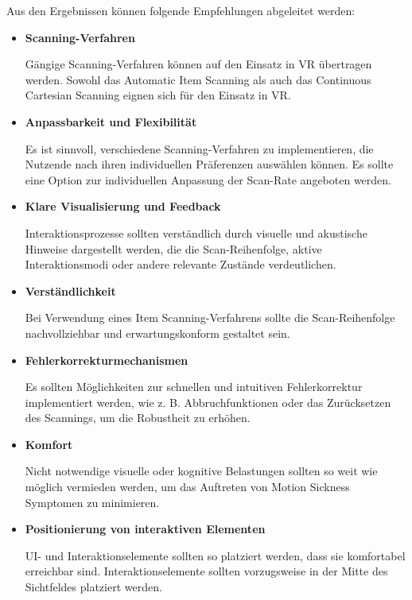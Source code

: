 Aus den Ergebnissen können folgende Empfehlungen abgeleitet werden:

\begin{itemize}
    \item \textbf{Scanning-Verfahren}
    
    Gängige Scanning-Verfahren können auf den Einsatz in VR übertragen werden. Sowohl das Automatic Item Scanning als auch das Continuous Cartesian Scanning eignen sich für den Einsatz in VR. 
    \item \textbf{Anpassbarkeit und Flexibilität}
    
    Es ist sinnvoll, verschiedene Scanning-Verfahren zu implementieren, die Nutzende nach ihren individuellen Präferenzen auswählen können. Es sollte eine Option zur individuellen Anpassung der Scan-Rate angeboten werden.  
    \item \textbf{Klare Visualisierung und Feedback}
    
    Interaktionsprozesse sollten verständlich durch visuelle und akustische Hinweise dargestellt werden, die die Scan-Reihenfolge, aktive Interaktionsmodi oder andere relevante Zustände verdeutlichen.
    \item \textbf{Verständlichkeit}
    
    Bei Verwendung eines Item Scanning-Verfahrens sollte die Scan-Reihenfolge nachvollziehbar und erwartungskonform gestaltet sein. 
    \item \textbf{Fehlerkorrekturmechanismen}
    
    Es sollten Möglichkeiten zur schnellen und intuitiven Fehlerkorrektur implementiert werden, wie z. B. Abbruchfunktionen oder das Zurücksetzen des Scannings, um die Robustheit zu erhöhen.
    \item \textbf{Komfort}
    
    Nicht notwendige visuelle oder kognitive Belastungen sollten so weit wie möglich vermieden werden, um das Auftreten von Motion Sickness Symptomen zu minimieren. 
    \item \textbf{Positionierung von interaktiven Elementen}
    
    UI- und Interaktionselemente sollten so platziert werden, dass sie komfortabel erreichbar sind. Interaktionselemente sollten vorzugsweise in der Mitte des Sichtfeldes platziert werden. 
\end{itemize}

